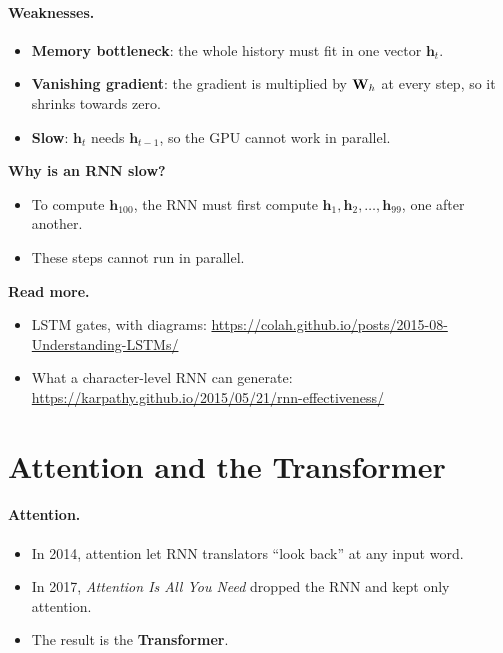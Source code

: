 \documentclass[12pt, a4paper]{article}
\providecommand{\bh}{\mathbf{h}}
\begin{document}
\paragraph{Weaknesses.}
\begin{itemize}
  \item \textbf{Memory bottleneck}: the whole history must fit in one vector
        $\bh_t$.
  \item \textbf{Vanishing gradient}: the gradient is multiplied by $\mathbf{W}_h$ at
        every step, so it shrinks towards zero.
  \item \textbf{Slow}: $\bh_t$ needs $\bh_{t-1}$, so the GPU cannot work in
        parallel.
\end{itemize}

\begin{notebox}
  \textbf{Why is an RNN slow?}
  \begin{itemize}
    \item To compute $\bh_{100}$, the RNN must first compute
          $\bh_1, \bh_2, \dots, \bh_{99}$, one after another.
    \item These steps cannot run in parallel.
  \end{itemize}
\end{notebox}

\begin{notebox}
  \textbf{Read more.}
  \begin{itemize}
    \item LSTM gates, with diagrams:\newline
          \url{https://colah.github.io/posts/2015-08-Understanding-LSTMs/}
    \item What a character-level RNN can generate:\newline
          \url{https://karpathy.github.io/2015/05/21/rnn-effectiveness/}
  \end{itemize}
\end{notebox}

\section{Attention and the Transformer}
\label{sec:transformer}

\paragraph{Attention.}
\begin{itemize}
  \item In 2014, attention let RNN translators ``look back'' at any input
        word.
  \item In 2017, \emph{Attention Is All You Need} dropped the RNN and kept
        only attention.
  \item The result is the \textbf{Transformer}.
\end{itemize}
\end{document}
